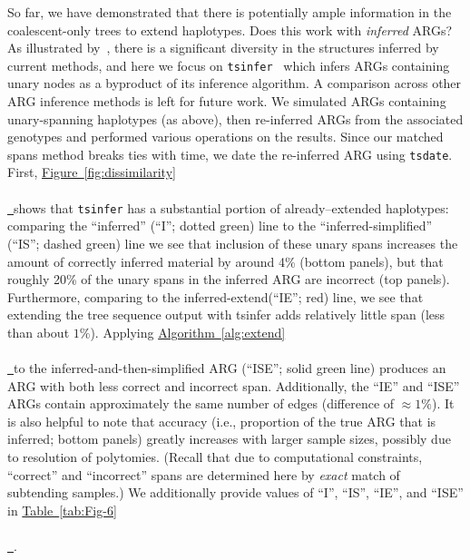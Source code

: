 \documentclass[10pt,twoside,lineno]{gsajnl}
\newcommand{\tsinfer}{\texttt{tsinfer}}
\newcommand{\tsdate}{\texttt{tsdate}}
\newcommand{\algorithmref}[2][]{%
	\hyperref[{#2}]{%
		Algorithm~\ref*{#2}%
		\ifx\\#1\\%
		\else
		\,#1%
		\fi
	}%
}
\newcommand*{\figref}[2][]{%
	\hyperref[{#2}]{%
		Figure~\ref*{#2}%
		\ifx\\#1\\%
		\else
		\,#1%
		\fi
	}%
}
\newcommand*{\tabref}[2][]{%
	\hyperref[{#2}]{%
		Table~\ref*{#2}%
		\ifx\\#1\\%
		\else
		\,#1%
		\fi
	}%
}
\begin{document}
So far, we have demonstrated that there is potentially ample information
in the coalescent-only trees to extend haplotypes.
Does this work with \emph{inferred} ARGs?
As illustrated by~\cite{wong2024general}, there is a significant diversity
in the structures inferred by current methods,
and here we focus on \tsinfer{}~\cite{kelleher2019inferring} which 
infers ARGs containing unary nodes as a byproduct of its inference algorithm.
A comparison across other ARG inference methods is left for future work.
We simulated ARGs containing unary-spanning haplotypes (as above), then
re-inferred ARGs from the associated genotypes and performed various operations
on the results.
Since our matched spans method breaks ties with time, 
we date the re-inferred ARG using \tsdate.
First, \figref{fig:dissimilarity} shows that \tsinfer{}
has a substantial portion of already--extended haplotypes:
comparing the ``inferred'' (``I''; dotted green) line to the ``inferred-simplified'' (``IS''; dashed green) line
we see that inclusion of these unary spans increases the amount of correctly inferred material
by around 4\% (bottom panels),
but that roughly 20\% of the unary spans in the inferred ARG are incorrect (top panels).
Furthermore, comparing to the inferred-extend(``IE''; red) line, we see that extending the tree sequence output
with tsinfer adds relatively little span (less than about $1\%$).
Applying \algorithmref{alg:extend} to the inferred-and-then-simplified ARG
(``ISE''; solid green line)
produces an ARG with both less correct and incorrect span.
Additionally, the ``IE'' and ``ISE'' ARGs 
contain approximately the same number of edges (difference of $\approx 1\%$).
It is also helpful to note that accuracy
(i.e., proportion of the true ARG that is inferred; bottom panels)
greatly increases with larger sample sizes,
possibly due to resolution of polytomies.
(Recall that due to computational constraints,
``correct'' and ``incorrect'' spans are determined here by \emph{exact} match
of subtending samples.) 
We additionally provide values of ``I'', ``IS'', ``IE'', and ``ISE'' in \tabref{tab:Fig-6}. 

%    
%
\end{document}
